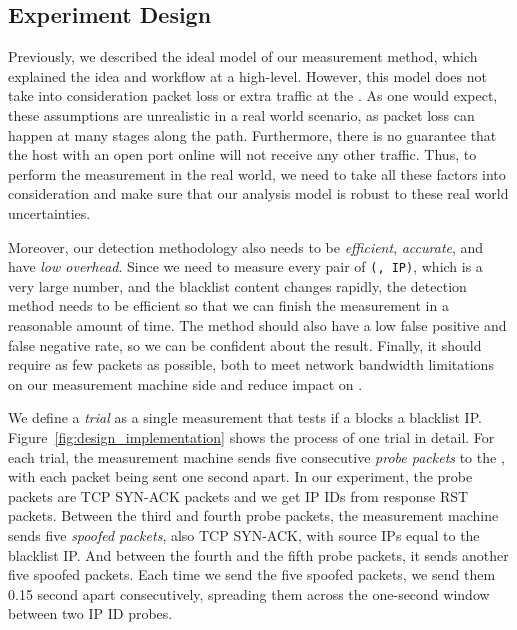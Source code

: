 
\subsection{Experiment Design}
\label{sec:methtrain}
Previously, we described the ideal model of our measurement method,
which explained the idea and workflow at a high-level. However, this model
does not take into consideration packet loss or extra traffic at the
{}. As one would expect, these assumptions are unrealistic in a real
world scenario, as packet loss can happen at many stages along the path.
Furthermore, there is no guarantee that the host with an open port online
will not receive any other traffic. Thus, to perform the measurement in the real
world, we need to take all these factors into consideration and make sure
that our analysis model is robust to these real world uncertainties.

Moreover, our detection methodology also needs to be \textit{efficient},
\textit{accurate}, and have \textit{low overhead}. Since we need to
measure every pair of \texttt{({}, IP)}, which is a
very large number, and the blacklist content changes rapidly, the detection
method needs to be efficient so that we can finish the measurement in a
reasonable amount of time. The method should also have a low false positive
and false negative rate, so we can be confident about the result. Finally, it
should require as few packets as possible, both to meet network bandwidth
limitations on our measurement machine side and reduce impact on
{}.

We define a \textit{trial} as a single measurement that tests if a
{} blocks a blacklist IP. Figure~\ref{fig:design_implementation}
shows the process of one trial in detail. For each trial, the measurement
machine sends five consecutive \textit{probe packets} to the {},
with each packet being sent one second apart. In our experiment, the probe
packets are TCP SYN-ACK packets and we get IP IDs from response RST packets.
Between the third and fourth probe packets, the measurement machine sends
five \textit{spoofed packets}, also TCP SYN-ACK, with source IPs equal to the
blacklist IP. And between the fourth and the fifth probe packets, it sends
another five spoofed packets. Each time we send the five spoofed packets, we
send them 0.15 second apart consecutively, spreading them across the one-second
window between two IP ID probes.

